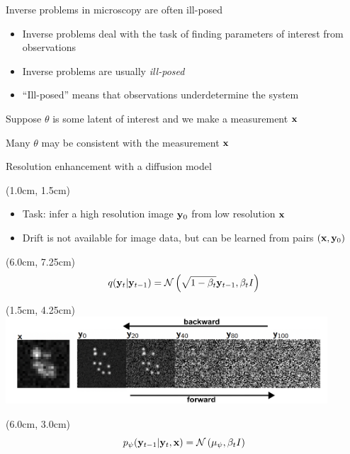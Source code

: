 \documentclass{beamer}					%
\begin{document}
\begin{frame}{Inverse problems in microscopy are often ill-posed}

\begin{itemize}
\item Inverse problems deal with the task of finding parameters of interest from observations
\item Inverse problems are usually \emph{ill-posed}
\item ``Ill-posed'' means that observations underdetermine the system
\end{itemize}

\vspace{0.2in}
Suppose $\theta$ is some latent of interest and we make a measurement $\bold{x}$

\vspace{0.2in}
Many $\theta$ may be consistent with the measurement $\bold{x}$

\end{frame}


\begin{frame}{Resolution enhancement with a diffusion model}

\begin{textblock*}{13cm}(1.0cm, 1.5cm)

\begin{itemize}
\item Task: infer a high resolution image $\bold{y}_0$ from low resolution $\bold{x}$
\item Drift is not available for image data, but can be learned from pairs $(\bold{x},\bold{y}_{0})$
\end{itemize}
\end{textblock*}

\begin{textblock*}{2cm}(6.0cm, 7.25cm)
\begin{equation*}
q(\bold{y}_{t}|\bold{y}_{t-1}) = \mathcal{N}\left(\sqrt{1-\beta_{t}}\bold{y}_{t-1},\beta_t I\right)
\end{equation*}
\end{textblock*}

\begin{textblock*}{12cm}(1.5cm, 4.25cm)
\includegraphics[width=12cm]{../../phd/ddpm/ddpm/media/ForwardBackward.png}
\end{textblock*}

\begin{textblock*}{2cm}(6.0cm, 3.0cm)
\begin{equation*}
p_{\psi}(\bold{y}_{t-1}|\bold{y}_{t},\bold{x}) = \mathcal{N}\left(\mu_{\psi},\beta_{t}I\right)
\end{equation*}

\end{textblock*}

\end{frame}
\end{document}
